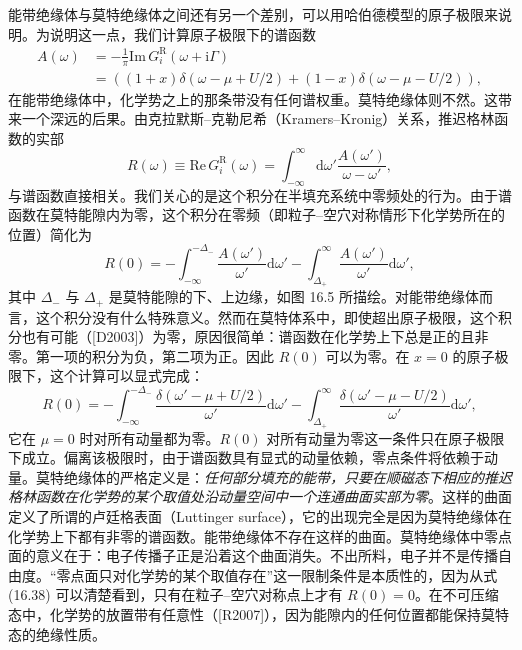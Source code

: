 能带绝缘体与莫特绝缘体之间还有另一个差别，可以用哈伯德模型的原子极限来说明。为说明这一点，我们计算原子极限下的谱函数
\begin{align*}
A(\omega)&=-\frac{1}{\pi}\mathrm{Im}\,G^{\mathrm{R}}_{i}(\omega+\mathrm{i}\Gamma)\\
&=\left((1+x)\delta(\omega-\mu+U/2)+(1-x)\delta(\omega-\mu-U/2)\right),\tag{16.35}
\end{align*}
在能带绝缘体中，化学势之上的那条带没有任何谱权重。莫特绝缘体则不然。这带来一个深远的后果。由克拉默斯--克勒尼希（Kramers--Kronig）关系，推迟格林函数的实部
\begin{equation*}
R(\omega)\equiv\mathrm{Re}\,G^{\mathrm{R}}_{i}(\omega)=\int_{-\infty}^{\infty}\mathrm{d}\omega'\frac{A(\omega')}{\omega-\omega'},\tag{16.36}
\end{equation*}
与谱函数直接相关。我们关心的是这个积分在半填充系统中零频处的行为。由于谱函数在莫特能隙内为零，这个积分在零频（即粒子--空穴对称情形下化学势所在的位置）简化为
\begin{equation*}
R(0)=-\int_{-\infty}^{-\Delta_{-}}\frac{A(\omega')}{\omega'}\mathrm{d}\omega'-\int_{\Delta_{+}}^{\infty}\frac{A(\omega')}{\omega'}\mathrm{d}\omega',\tag{16.37}
\end{equation*}
其中 $\Delta_{-}$ 与 $\Delta_{+}$ 是莫特能隙的下、上边缘，如图 16.5 所描绘。对能带绝缘体而言，这个积分没有什么特殊意义。然而在莫特体系中，即使超出原子极限，这个积分也有可能（[D2003]）为零，原因很简单：谱函数在化学势上下总是正的且非零。第一项的积分为负，第二项为正。因此 $R(0)$ 可以为零。在 $x=0$ 的原子极限下，这个计算可以显式完成：
\begin{equation*}
R(0)=-\int_{-\infty}^{-\Delta_{-}}\frac{\delta(\omega'-\mu+U/2)}{\omega'}\mathrm{d}\omega'-\int_{\Delta_{+}}^{\infty}\frac{\delta(\omega'-\mu-U/2)}{\omega'}\mathrm{d}\omega',\tag{16.38}
\end{equation*}
它在 $\mu=0$ 时对所有动量都为零。$R(0)$ 对所有动量为零这一条件只在原子极限下成立。偏离该极限时，由于谱函数具有显式的动量依赖，零点条件将依赖于动量。莫特绝缘体的严格定义是：\emph{任何部分填充的能带，只要在顺磁态下相应的推迟格林函数在化学势的某个取值处沿动量空间中一个连通曲面实部为零}。这样的曲面定义了所谓的卢廷格表面（Luttinger surface），它的出现完全是因为莫特绝缘体在化学势上下都有非零的谱函数。能带绝缘体不存在这样的曲面。莫特绝缘体中零点面的意义在于：电子传播子正是沿着这个曲面消失。不出所料，电子并不是传播自由度。“零点面只对化学势的某个取值存在”这一限制条件是本质性的，因为从式 (16.38) 可以清楚看到，只有在粒子--空穴对称点上才有 $R(0)=0$。在不可压缩态中，化学势的放置带有任意性（[R2007]），因为能隙内的任何位置都能保持莫特态的绝缘性质。

